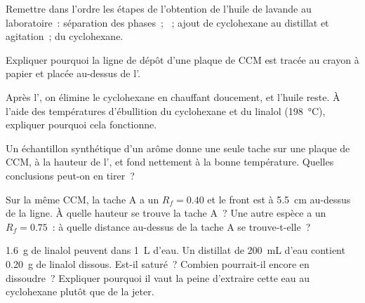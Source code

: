 \begin{exercise}[$\star\star$]\label{exo:g10:chemical-species:10}
Remettre dans l'ordre les étapes de l'obtention de l'huile de lavande au
laboratoire~: séparation des phases~; ~; ajout de
cyclohexane au distillat et agitation~;  du cyclohexane.
\end{exercise}

\begin{exercise}[$\star\star$]\label{exo:g10:chemical-species:11}
Expliquer pourquoi la ligne de dépôt d'une plaque de CCM est tracée au
crayon à papier et placée au-dessus de l'.
\end{exercise}

\begin{exercise}[$\star\star\star$]\label{exo:g10:chemical-species:12}
Après l', on élimine le cyclohexane en chauffant doucement, et
l'huile reste. À l'aide des températures d'ébullition du cyclohexane et
du linalol (\qty{198}{\celsius}), expliquer pourquoi cela fonctionne.
\end{exercise}

\begin{exercise}[$\star\star\star$]\label{exo:g10:chemical-species:13}
Un échantillon synthétique d'un arôme donne une seule tache sur une
plaque de CCM, à la hauteur de l', et fond nettement à
la bonne température. Quelles conclusions peut-on en tirer~?
\end{exercise}

\begin{exercise}[$\star\star\star$]\label{exo:g10:chemical-species:14}
Sur la même CCM, la tache A a un $R_f = 0.40$ et le front est à
\qty{5.5}{cm} au-dessus de la ligne. À quelle hauteur se trouve la tache
A~? Une autre espèce a un $R_f = 0.75$~: à quelle distance au-dessus de
la tache A se trouve-t-elle~?
\end{exercise}

\begin{exercise}[$\star\star\star$]\label{exo:g10:chemical-species:15}
\qty{1.6}{g} de linalol peuvent  dans \qty{1}{L} d'eau. Un
distillat de \qty{200}{mL} d'eau contient \qty{0.20}{g} de linalol
dissous. Est-il saturé~? Combien pourrait-il encore en dissoudre~?
Expliquer pourquoi il vaut la peine d'extraire cette eau au cyclohexane
plutôt que de la jeter.
\end{exercise}

